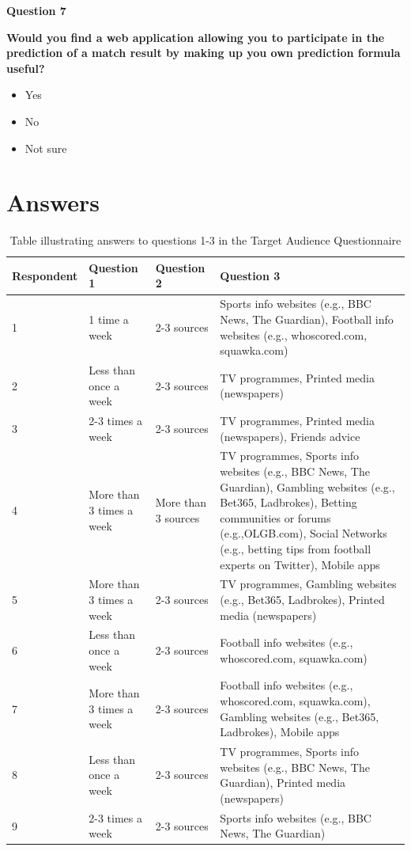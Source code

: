 \textbf{Question 7}\par
\textbf{Would you find a web application allowing you to participate in the prediction of a match result by making up you own prediction formula useful?}
\begin{itemize}
	\item Yes
	\item No
	\item Not sure
 \end{itemize}
 
\section{Answers}
\label{sec:ta_answers_appendix}
\noindent
\begin{table}
\begin{tabular}{
  |p{}%
  |p{}%
  |p{}%
  |p{}|%
  }
  \hline
  \centering Respondent  & \centering Question 1  & \centering Question 2 & \centering\arraybackslash Question 3   \\ \hline
  1 & 1 time a week & 2-3 sources & Sports info websites (e.g., BBC News, The Guardian), Football info websites (e.g., whoscored.com, squawka.com) \\ \hline
  2 & Less than once a week & 2-3 sources & TV programmes, Printed media (newspapers) \\ \hline
  3 & 2-3 times a week & 2-3 sources & TV programmes, Printed media (newspapers), Friends advice \\ \hline
  4 & More than 3 times a week & More than 3 sources & TV programmes, Sports info websites (e.g., BBC News, The Guardian), Gambling websites (e.g., Bet365, Ladbrokes), Betting communities or forums (e.g.,OLGB.com), Social Networks (e.g., betting tips from football experts on Twitter), Mobile apps \\ \hline
  5 & More than 3 times a week & 2-3 sources & TV programmes, Gambling websites (e.g., Bet365, Ladbrokes), Printed media (newspapers) \\ \hline
  6 & Less than once a week & 2-3 sources & Football info websites (e.g., whoscored.com, squawka.com) \\ \hline
  7 & More than 3 times a week & 2-3 sources & Football info websites (e.g., whoscored.com, squawka.com), Gambling websites (e.g., Bet365, Ladbrokes), Mobile apps \\ \hline
  8 & Less than once a week & 2-3 sources & TV programmes, Sports info websites (e.g., BBC News, The Guardian), Printed media (newspapers) \\ \hline
  9 & 2-3 times a week & 2-3 sources & Sports info websites (e.g., BBC News, The Guardian) \\ \hline
\end{tabular}
\\[10pt]
\caption{Table illustrating answers to questions 1-3 in the Target Audience Questionnaire}
\end{table}

